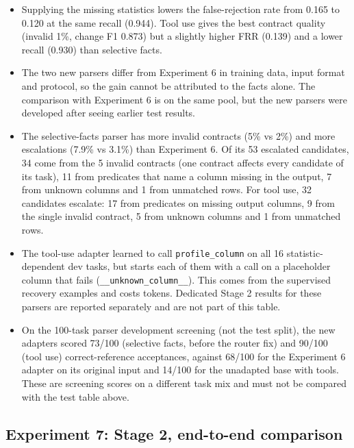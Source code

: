 \documentclass[11pt]{article}
\providecommand{\tightlist}{\setlength{\itemsep}{0pt}\setlength{\parskip}{0pt}}
\begin{document}
\begin{itemize}
  \begin{itemize}
  \tightlist
  \item
    Supplying the missing statistics lowers the false-rejection rate
    from 0.165 to 0.120 at the same recall (0.944). Tool use gives the
    best contract quality (invalid 1\%, change F1 0.873) but a slightly
    higher FRR (0.139) and a lower recall (0.930) than selective facts.
  \item
    The two new parsers differ from Experiment 6 in training data, input
    format and protocol, so the gain cannot be attributed to the facts
    alone. The comparison with Experiment 6 is on the same pool, but the
    new parsers were developed after seeing earlier test results.
  \item
    The selective-facts parser has more invalid contracts (5\% vs 2\%)
    and more escalations (7.9\% vs 3.1\%) than Experiment 6. Of its 53
    escalated candidates, 34 come from the 5 invalid contracts (one
    contract affects every candidate of its task), 11 from predicates
    that name a column missing in the output, 7 from unknown columns and
    1 from unmatched rows. For tool use, 32 candidates escalate: 17 from
    predicates on missing output columns, 9 from the single invalid
    contract, 5 from unknown columns and 1 from unmatched rows.
  \item
    The tool-use adapter learned to call
    \texttt{profile\_\allowbreak{}column} on all 16 statistic-dependent
    dev tasks, but starts each of them with a call on a placeholder
    column that fails
    (\texttt{\_\allowbreak{}\_\allowbreak{}unknown\_\allowbreak{}column\_\allowbreak{}\_\allowbreak{}}).
    This comes from the supervised recovery examples and costs tokens.
    Dedicated Stage 2 results for these parsers are reported separately
    and are not part of this table.
  \item
    On the 100-task parser development screening (not the test split),
    the new adapters scored 73/100 (selective facts, before the router
    fix) and 90/100 (tool use) correct-reference acceptances, against
    68/100 for the Experiment 6 adapter on its original input and 14/100
    for the unadapted base with tools. These are screening scores on a
    different task mix and must not be compared with the test table
    above.
  \end{itemize}
\end{itemize}

\subsection{Experiment 7: Stage 2, end-to-end comparison}
\end{document}

